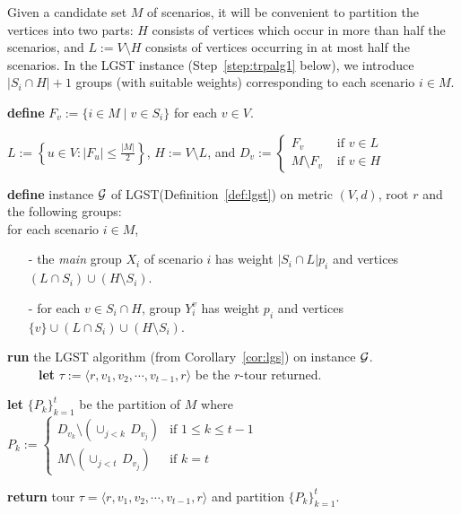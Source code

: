 \documentclass[11pt]{article}
\def\palgl{\ensuremath{{\sf PartnLat}}\xspace}
\def\lgs{{\sf LGST}\xspace}
\begin{document}
Given a candidate set $M$ of scenarios, it will be convenient to partition the vertices into two parts: $H$ consists of vertices which occur in more than half the scenarios, and $L:=V\setminus H$ consists of vertices occurring in at most half the scenarios. In the \lgs instance (Step~\ref{step:trpalg1} below), we 
introduce $|S_i\cap H|+1$ groups (with suitable weights) corresponding to each scenario $i\in M$.






\begin{algorithm}[h!]
  \caption{$\palgl(\;\langle M,\{q_i\}_{i\in M}, \{S_i\}_{i\in M} \rangle\;)$}
  \label{alg:trppalg}
  \begin{algorithmic}[1]
    \STATE\label{step:trppalg0} {\bf define} $F_v:=\{i\in
    M\mid v\in S_i\}$  for each $v\in V$.

     $L := \left\{u \in V : |F_u| \leq \frac{|M|}{2} \right\}$, $H := V \setminus
    L$,    and {\small $D_v := \left\{\begin{array}{ll} F_v & \mbox{ if }v\in L\\
    M\setminus F_v &\mbox{ if }v\in H\end{array}\right.$}


   \STATE\label{step:trpalg1} {\bf define} instance ${\cal G}$ of \lgs (Definition~\ref{def:lgst}) 
    on metric $(V,d)$, root $r$ and the following groups:\\
   for each scenario $i\in M$,
   \begin{itemize}
   \item[-] the \emph{main} group $X_i$ 
     of scenario $i$  has weight $|S_i \cap L| p_i$
     and vertices $(L \cap S_i) \cup (H \setminus S_i)$.

   \item[-] for each $v \in S_i \cap H$, group $Y_i^v$
     has weight $p_i$ and vertices $\{v\} \cup  (L \cap S_i) \cup (H \setminus S_i)$.
   \end{itemize}



   \STATE\label{step:trppalg3} \textbf{run} the \lgs algorithm (from Corollary~\ref{cor:lgs}) on instance ${\cal G}$.   \\
   ~~~~~\textbf{let} $\tau :=\langle r,v_1,v_2,\cdots,v_{t-1},r\rangle$ be the $r$-tour  returned.

    \STATE \label{step:trppalg4} \textbf{let} $\{P_k\}_{k=1}^t$ be the
    partition of $M$ where
    {\small $P_k:= \left\{
      \begin{array}{ll}
        D_{v_k}\setminus \left(\cup_{j<k} \, D_{v_j}\right) & \text{if }
        1\le k\le t-1\\
        M\setminus \left(\cup_{j<t} \, D_{v_j}\right) & \text{if }
        k=t\end{array}\right.
    $}

   \STATE \textbf{return} tour $\tau = \langle r,v_1,v_2,\cdots,v_{t-1},r\rangle$ and   partition
   $\{P_k\}_{k=1}^{t}$.
 \end{algorithmic}
\end{algorithm}
\end{document}
